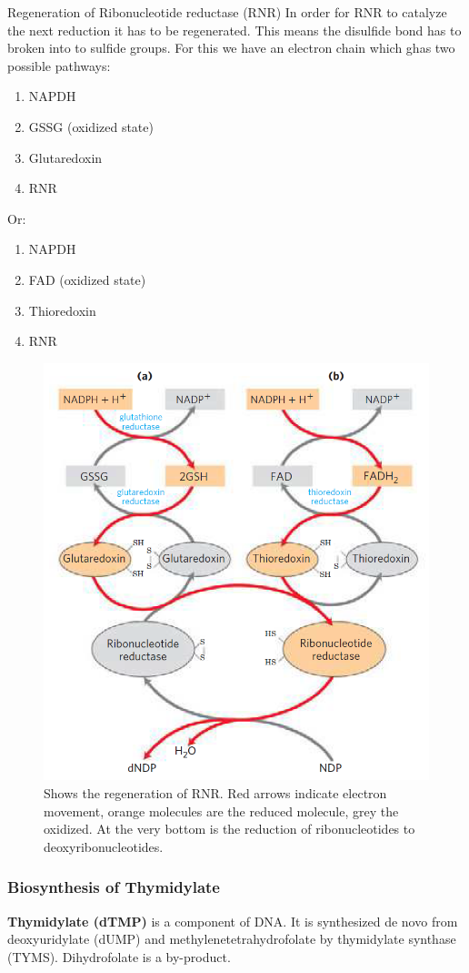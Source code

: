 \documentclass[../main.tex]{subfiles}
\begin{document}
\begin{RemarkWithTitel}{Regeneration of Ribonucleotide reductase (RNR)}
	In order for RNR to catalyze the next reduction it has to be regenerated. This means the disulfide bond has to broken into to sulfide groups. For this we have an electron chain which ghas two possible pathways:
	\begin{enumerate}
		\item NAPDH
		\item GSSG (oxidized state)
		\item Glutaredoxin
		\item RNR
	\end{enumerate}
	Or:
	\begin{enumerate}
		\item NAPDH
		\item FAD (oxidized state)
		\item Thioredoxin
		\item RNR
	\end{enumerate}
	
	\begin{figure}[H]
		\centering
		\includegraphics[width=0.5\linewidth]{rnr_regen}
		\caption{Shows the regeneration of RNR. Red arrows indicate electron movement, orange molecules are the reduced molecule, grey the oxidized. At the very bottom is the reduction of ribonucleotides to deoxyribonucleotides.}
		\label{fig:rnrregen}
	\end{figure}
	
\end{RemarkWithTitel}


\subsubsection{Biosynthesis of Thymidylate}

\textbf{\gls{Thymidylate (dTMP)}} is a component of DNA. It is synthesized de novo from deoxyuridylate (dUMP) and methylenetetrahydrofolate by thymidylate synthase (TYMS). Dihydrofolate is a by-product. \\
\end{document}
